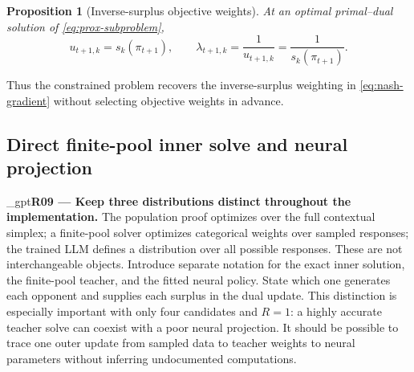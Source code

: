 \documentclass{article}
\makeatletter
\newif\ifshowreviews
\let\revieworiginalref\ref
\newcommand{\reviewref}[1]{%
  \@ifundefined{r@#1}{\textnormal{[original-draft ref.: \texttt{\detokenize{#1}}]}}%
  {\revieworiginalref{#1}}}
\let\ref\reviewref
\newcommand{\reviewresponse}[1]{%
  \ifshowreviews
  \par\begingroup\color{blue!65!black}\hypersetup{allcolors=blue!65!black}\emergencystretch=2em%
  \noindent\textbf{Response:} #1\par\endgroup
  \fi}
\newtheorem{proposition}{Proposition}
\theoremstyle{remark}
\theoremstyle{plain}
\makeatother
\begin{document}
\begin{proposition}[Inverse-surplus objective weights]
\label{prop:prox-dual}
At an optimal primal--dual solution of \eqref{eq:prox-subproblem},
\begin{equation}
u_{t+1,k}=s_k(\pi_{t+1}),
\qquad
\lambda_{t+1,k}=\frac{1}{u_{t+1,k}}=\frac{1}{s_k(\pi_{t+1})}.
\label{eq:kkt-weights}
\end{equation}
\end{proposition}
Thus the constrained problem recovers the inverse-surplus weighting in \eqref{eq:nash-gradient} without selecting objective weights in advance.

\subsection{Direct finite-pool inner solve and neural projection}
\label{sec:finite-pool-solve}
\kekim_gpt{\textbf{R09 --- Keep three distributions distinct throughout the implementation.} The population proof optimizes over the full contextual simplex; a finite-pool solver optimizes categorical weights over sampled responses; the trained LLM defines a distribution over all possible responses. These are not interchangeable objects. Introduce separate notation for the exact inner solution, the finite-pool teacher, and the fitted neural policy. State which one generates each opponent and supplies each surplus in the dual update. This distinction is especially important with only four candidates and $R=1$: a highly accurate teacher solve can coexist with a poor neural projection. It should be possible to trace one outer update from sampled data to teacher weights to neural parameters without inferring undocumented computations.}
\reviewresponse{\textbf{R09 --- Addressed in notation and diagnostics.} The method distinguishes the population solution $\pi_t^\star(\lambda)$, finite-pool target $p_{t,x}^\star(\lambda)$ and neural policy $\pi_\theta$. Pool opponents and prompt-averaged surpluses drive the dual solve; one neural fit follows. Table~\ref{tab:target-transfer} evaluates exact targets, importance-reweighted fitted pools and fresh responses separately, without identifying them as the same distribution.}
\end{document}
